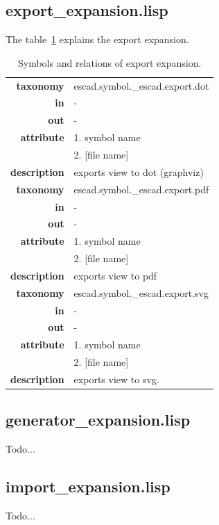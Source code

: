 \documentclass[a4paper, 12pt, openany]{scrbook}
\begin{document}
\subsection{export\_expansion.lisp}
The table~\ref{tab:exp-export-expansion} explains the export expansion.
\newcommand{\tabitem}{~~\llap{\textbullet}~~}
\begin{table}[htbp]
\centering
\begin{tabular}{rp{11cm}}
  \toprule
  \textbf{taxonomy} & \colorbox{black!20}{escad.symbol.\_escad.export.dot} \\
  \textbf{in} & - \\
  \textbf{out} & - \\
  \textbf{attribute} & 1. symbol name \\
                     & 2. [file name] \\
  \textbf{description} & exports view to dot (graphviz) \\
  \midrule
  \textbf{taxonomy} & \colorbox{black!20}{escad.symbol.\_escad.export.pdf} \\
  \textbf{in} & - \\
  \textbf{out} & - \\
  \textbf{attribute} & 1. symbol name \\
                     & 2. [file name] \\
  \textbf{description} & exports view to pdf \\
  \midrule
  \textbf{taxonomy} & \colorbox{black!20}{escad.symbol.\_escad.export.svg} \\
  \textbf{in} & - \\
  \textbf{out} & - \\
  \textbf{attribute} & 1. symbol name \\
                     & 2. [file name] \\
  \textbf{description} & exports view to svg. \\
  \bottomrule
\end{tabular}
\caption{Symbols and relations of export expansion.}
\label{tab:exp-export-expansion}
\end{table}
\subsection{generator\_expansion.lisp}
Todo...
\subsection{import\_expansion.lisp}
Todo...
\end{document}
